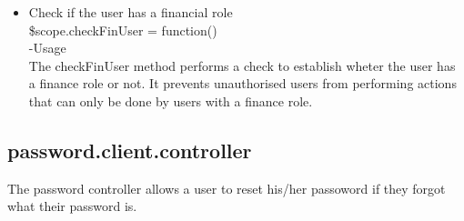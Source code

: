 \documentclass[a4paper,12pt]{article}
\begin{document}
\begin{enumerate}
\begin{itemize}
\item Check if the user has a financial role\\
 \$scope.checkFinUser = function()\\
-Usage\\
The checkFinUser method performs a check to establish wheter the user has a finance role or not. It prevents unauthorised users from performing actions that can only be done by users with a finance role.
	\end{itemize}
 \end{enumerate}
 \subsection{password.client.controller}
 The password controller allows a user to reset his/her passoword if they forgot what their password is. 
\end{document}
